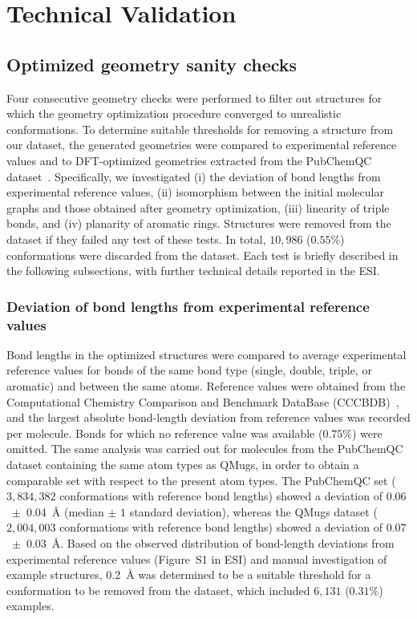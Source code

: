 \section*{Technical Validation}


\subsection*{Optimized geometry sanity checks}
Four consecutive geometry checks were performed to filter out structures for which the geometry optimization procedure converged to unrealistic conformations. To determine suitable thresholds for removing a structure from our dataset, the generated geometries were compared to experimental reference values and to DFT-optimized geometries extracted from the PubChemQC dataset~\cite{nakata2017pubchemqc}. Specifically, we investigated (i) the deviation of bond lengths from experimental reference values, (ii) isomorphism between the initial molecular graphs and those obtained after geometry optimization, (iii) linearity of triple bonds, and (iv) planarity of aromatic rings. Structures were removed from the dataset if they failed any test of these tests. In total, $10,986$ ($0.55$\%) conformations were discarded from the dataset. Each test is briefly described in the following subsections, with further technical details reported in the ESI.

\subsubsection*{Deviation of bond lengths from experimental reference values}
Bond lengths in the optimized structures were compared to average experimental reference values for bonds of the same bond type (single, double, triple, or aromatic) and between the same atoms. Reference values were obtained from the Computational Chemistry Comparison and Benchmark DataBase (CCCBDB)~\cite{nist_database}, and the largest absolute bond-length deviation from reference values was recorded per molecule. Bonds for which no reference value was available ($0.75\%$) were omitted. The same analysis was carried out for molecules from the PubChemQC dataset containing the same atom types as QMugs, in order to obtain a comparable set with respect to the present atom types. The PubChemQC set ($3,834,382$ conformations with reference bond lengths) showed a deviation of $0.06$~$\pm$~\SI{0.04}{\angstrom} (median $\pm$ $1$ standard deviation), whereas the QMugs dataset ($2,004,003$ conformations with reference bond lengths) showed a deviation of $0.07$~$\pm$~\SI{0.03}{\angstrom}. Based on the observed distribution of bond-length deviations from experimental reference values (Figure~S1 in ESI) and manual investigation of example structures, \SI{0.2}{\angstrom} was determined to be a suitable threshold for a conformation to be removed from the dataset, which included $6,131$ ($0.31$\%) examples.

